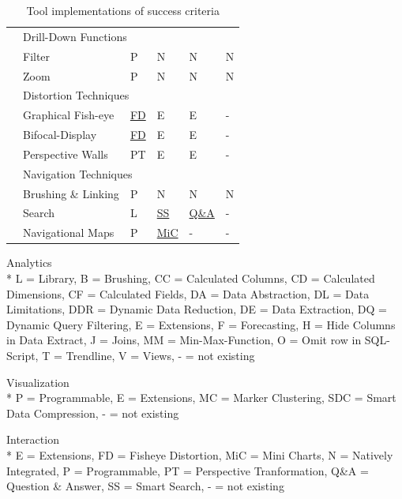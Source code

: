 \begin{table}[H]
\begin{tabular}{|l| l l l l l|}
        & \multicolumn{5}{l|}{\cellcolor{gray!30}Drill-Down Functions}\\\cline{2-6}
        & Filter    & P & N & N & N \\
        & Zoom      & P & N & N & N \\ \cline{2-6}
        
        & \multicolumn{5}{l|}{\cellcolor{gray!30}Distortion Techniques}\\\cline{2-6}
        & Graphical Fish-eye    & \hyperlink{https://bost.ocks.org/mike/fisheye/}{FD} \cite{Bostock2012}       & E  & E  & - \\
        & Bifocal-Display       & \hyperlink{https://bost.ocks.org/mike/fisheye/}{FD} \cite{Bostock2012}       & E  & E  & - \\
        & Perspective Walls     & PT & E & E & - \\ \cline{2-6}
        
        & \multicolumn{5}{l|}{\cellcolor{gray!30}Navigation Techniques}\\\cline{2-6}
        & Brushing \& Linking   & P & N & N & N \\
        & Search                &  L & \hyperlink{https://help.qlik.com/en-US/sense/2.2/Subsystems/Hub/Content/Search/search-tool.htm}{SS}& \hyperlink{https://powerbi.microsoft.com/en-us/documentation/powerbi-service-q-and-a/}{Q\&A}& - \\
        & Navigational Maps     & P & \hyperlink{https://help.qlik.com/en-US/sense/1.1/Subsystems/Hub/Content/Visualizations/BarChart/BarChart.htm}{MiC}  & -           & -\\
        \hline
    \end{tabular}
    \caption{Tool implementations of success criteria}
    \label{table:features}
    \end{table}
    
    Analytics\\*
    L = Library, B = Brushing, CC = Calculated Columns, CD = Calculated Dimensions, CF = Calculated Fields, DA = Data Abstraction, DL = Data Limitations, DDR = Dynamic Data Reduction, DE = Data Extraction, DQ = Dynamic Query Filtering, E = Extensions, F = Forecasting, H = Hide Columns in Data Extract, J = Joins, MM = Min-Max-Function, O = Omit row in SQL-Script, T = Trendline, V = Views, - = not existing
    \par 
    Visualization\\*
    P = Programmable, E = Extensions, MC = Marker Clustering, SDC = Smart Data Compression, - = not existing
    \par
    Interaction\\*
    E = Extensions, FD = Fisheye Distortion, MiC = Mini Charts, N = Natively Integrated, P = Programmable, PT = Perspective Tranformation, Q\&A = Question \& Answer,  SS = Smart Search, - = not existing

